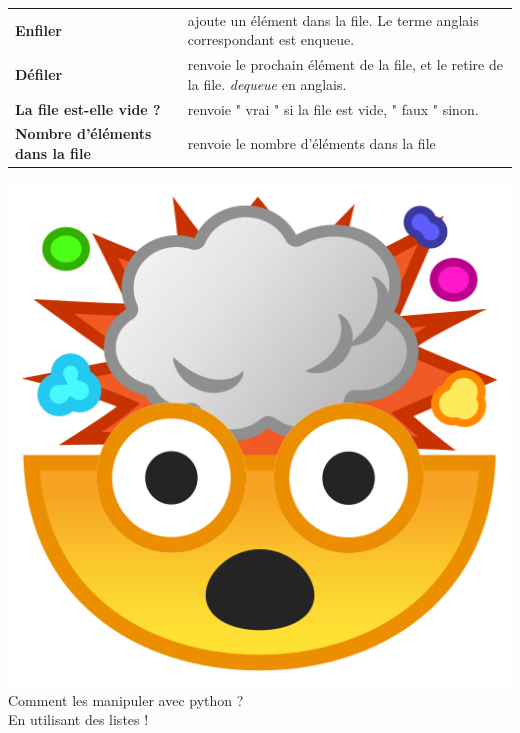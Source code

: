 \begin{tabular}{l|l}
     \textbf{Enfiler} & ajoute un élément dans la file. Le terme anglais correspondant est enqueue.\\
     \textbf{Défiler} & renvoie le prochain élément de la file, et le retire de la file. \textit{dequeue} en anglais.\\
     \textbf{La file est-elle vide ?} & renvoie  " vrai  " si la file est vide,  " faux  " sinon.\\
     \textbf{Nombre d'éléments dans la file} & renvoie le nombre d'éléments dans la file \\[0.5cm]
\end{tabular}



\includegraphics[scale=0.03]{Thème 1 – Structures de données/Chapitre 1 - Interface et implémentation/BLOB/mindblow}{\selectfont
Comment les manipuler avec python ?
}\\[0.5cm]
En utilisant des listes !
